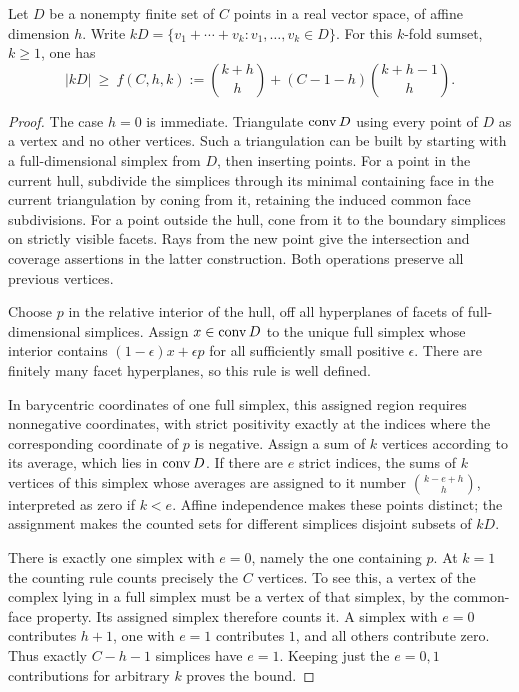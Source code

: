 \begin{lemma}[Sumsets]\label{lem:sumset}
Let \(D\) be a nonempty finite set of \(C\) points in a real vector space,
of affine dimension \(h\). Write
\(kD=\{v_1+\cdots+v_k:v_1,\ldots,v_k\in D\}\).
For this \(k\)-fold sumset, \(k\ge1\), one has
\[
 |kD|\ \ge\
 f(C,h,k):=\binom{k+h}{h}+(C-1-h)\binom{k+h-1}{h}.
\]
\end{lemma}
\begin{proof}
The case \(h=0\) is immediate. Triangulate \(\operatorname{conv} D\) using every point
of \(D\) as a vertex and no other vertices. Such a triangulation can be
built by starting with a full-dimensional simplex from \(D\), then
inserting points. For a point in the current hull, subdivide the simplices
through its minimal containing face in the current triangulation by
coning from it, retaining the induced common face subdivisions.
For a point outside the hull, cone from it to the
boundary simplices on strictly visible facets. Rays from the new point
give the intersection and coverage assertions in the latter construction.
Both operations preserve all previous vertices.

Choose \(p\) in the relative interior of the hull, off all hyperplanes
of facets of full-dimensional simplices. Assign \(x\in\operatorname{conv} D\) to the
unique full simplex whose interior contains \((1-\epsilon)x+\epsilon p\)
for all sufficiently small positive \(\epsilon\). There are finitely many
facet hyperplanes, so this rule is well defined.

In barycentric coordinates of one full simplex, this assigned region
requires nonnegative coordinates, with strict positivity exactly at the
indices where the corresponding coordinate of \(p\) is negative.
Assign a sum of \(k\) vertices according to its average, which lies in
\(\operatorname{conv} D\). If there are \(e\) strict indices, the sums of \(k\) vertices
of this simplex whose averages are assigned to it number
\(\binom{k-e+h}{h}\), interpreted as zero if \(k<e\).
Affine independence makes these points distinct; the assignment makes
the counted sets for different simplices disjoint subsets of \(kD\).

There is exactly one simplex with \(e=0\), namely the one containing
\(p\). At \(k=1\) the counting rule counts precisely the \(C\) vertices.
To see this, a vertex of the complex lying in a full simplex must be a
vertex of that simplex, by the common-face property. Its assigned
simplex therefore counts it. A simplex with \(e=0\) contributes \(h+1\),
one with \(e=1\) contributes \(1\), and all others contribute zero.
Thus exactly \(C-h-1\) simplices have \(e=1\). Keeping just the \(e=0,1\)
contributions for arbitrary \(k\) proves the bound.
\end{proof}

